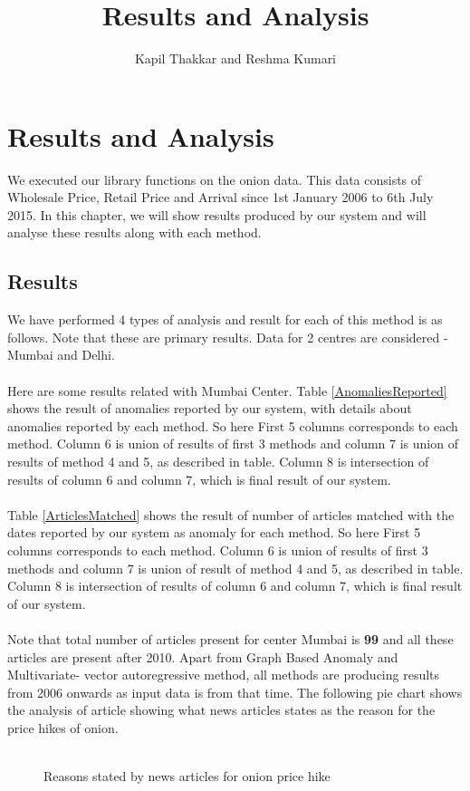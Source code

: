 \documentclass[a4paper,10pt]{report}
\title{Results and Analysis}
\author{Kapil Thakkar and Reshma Kumari}
\begin{document}
\maketitle

\chapter{Results and Analysis}

We executed our library functions on the onion data. This data consists of 
Wholesale Price, Retail Price and Arrival since 1st January 2006 to 6th July 
2015. In this chapter, we will show results produced by our system and will 
analyse these results along with each method.

\section{Results}

We have performed 4 types of analysis and result for each of this method is as 
follows. Note that these are primary results. Data for 2 centres are considered 
- Mumbai and Delhi.\\
\\
Here are some results related with Mumbai Center. Table \ref{AnomaliesReported} shows the result of anomalies reported by our system, with details about anomalies reported by each method. So here First 5 columns corresponds to each method. Column 6 is union of results of first 3 methods and column 7 is union of results of method 4 and 5, as described in table. Column 8 is intersection of results of column 6 and column 7, which is final result of our system.\\
\\
Table \ref{ArticlesMatched} shows the result of number of articles matched with the dates reported by our system as anomaly for each method. So here First 5 columns corresponds to each method. Column 6 is union of results of first 3 methods and column 7 is union of result of method 4 and 5, as described in table. Column 8 is intersection of results of column 6 and column 7, which is final result of our system.\\
\\
Note that total number of articles present for center Mumbai is \textbf{99} and all these articles are present after 2010. Apart from Graph Based Anomaly and Multivariate- vector autoregressive method, all methods are producing results from 2006 onwards as input data is from that time. The following pie chart shows the analysis of article showing what news articles states as the reason for the price hikes of onion.\\
\\
\begin{figure}
\centering
{}
\caption{Reasons stated by news articles for onion price hike}
\label{fig:pieReasons}
\end{figure}
\end{document}
